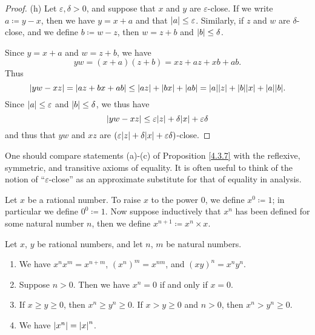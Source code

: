 \begin{proof}{(h)}
    Let \(\varepsilon, \delta > 0\), and suppose that \(x\) and \(y\) are \(\varepsilon\)-close.
    If we write \(a \coloneqq y - x\), then we have \(y = x + a\) and that \(\left\lvert a\right\rvert \leq \varepsilon\).
    Similarly, if \(z\) and \(w\) are \(\delta\)-close, and we define \(b \coloneqq w - z\), then \(w = z + b\) and \(\left\lvert b\right\rvert \leq \delta\).

    Since \(y = x + a\) and \(w = z + b\), we have
    \[
        yw = (x + a)(z + b) = xz + az + xb + ab.
    \]
    Thus
    \[
        \abs{yw - xz} = \abs{az + bx + ab} \leq \abs{az} + \abs{bx} + \abs{ab} = \abs{a}\abs{z} + \abs{b}\abs{x} + \abs{a}\abs{b}.
    \]
    Since \(\left\lvert a\right\rvert \leq \varepsilon\) and \(\left\lvert b\right\rvert \leq \delta\), we thus have
    \[
        \abs{yw - xz} \leq \varepsilon\abs{z} + \delta\abs{x} + \varepsilon\delta
    \]
    and thus that \(yw\) and \(xz\) are \((\varepsilon\abs{z} + \delta\abs{x} + \varepsilon\delta)\)-close.
\end{proof}

\begin{remark}\label{4.3.8}
    One should compare statements (a)-(c) of Proposition \ref{4.3.7} with the reflexive, symmetric, and transitive axioms of equality.
    It is often useful to think of the notion of ``\(\varepsilon\)-close'' as an approximate substitute for that of equality in analysis.
\end{remark}

\begin{definition}\label{4.3.9}
    Let \(x\) be a rational number.
    To raise \(x\) to the power \(0\), we define \(x^0 \coloneqq 1\);
    in particular we define \(0^0 \coloneqq 1\).
    Now suppose inductively that \(x^n\) has been defined for some natural number \(n\), then we define \(x^{n+1} \coloneqq x^n \times x\).
\end{definition}

\begin{proposition}\label{4.3.10}
    Let \(x\), \(y\) be rational numbers, and let \(n\), \(m\) be natural numbers.
    \begin{enumerate}
        \item We have \(x^n x^m = x^{n + m}\), \((x^n)^m = x^{nm}\), and \((xy)^n = x^n y^n\).
        \item Suppose \(n > 0\).
              Then we have \(x^n = 0\) if and only if \(x = 0\).
        \item If \(x \geq y \geq 0\), then \(x^n \geq y^n \geq 0\).
              If \(x > y \geq 0\) and \(n > 0\), then \(x^n > y^n \geq 0\).
        \item We have \(\left\lvert x^n\right\rvert = \left\lvert x\right\rvert^n\).
    \end{enumerate}
\end{proposition}

